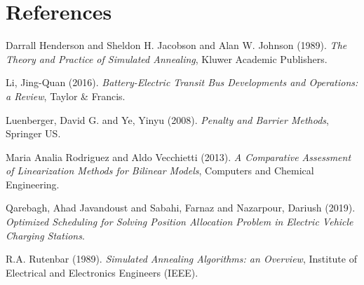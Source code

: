 \documentclass[11pt,a4paper,final]{article}
\begin{document}
\section{References}
\label{sec:orgea233e3}
\noindent
Darrall Henderson and Sheldon H. Jacobson and Alan W. Johnson (1989). \emph{The Theory and Practice of Simulated Annealing}, Kluwer Academic Publishers.

\noindent
Li, Jing-Quan (2016). \emph{Battery-Electric Transit Bus Developments and Operations: a Review}, Taylor \& Francis.

\noindent
Luenberger, David G. and Ye, Yinyu (2008). \emph{Penalty and Barrier Methods}, Springer US.

\noindent
Maria Analia Rodriguez and Aldo Vecchietti (2013). \emph{A Comparative Assessment of Linearization Methods for Bilinear Models}, Computers and Chemical Engineering.

\noindent
Qarebagh, Ahad Javandoust and Sabahi, Farnaz and Nazarpour, Dariush (2019). \emph{Optimized Scheduling for Solving Position Allocation Problem in Electric Vehicle Charging Stations}.

\noindent
R.A. Rutenbar (1989). \emph{Simulated Annealing Algorithms: an Overview}, Institute of Electrical and Electronics Engineers ({IEEE}).
\end{document}

